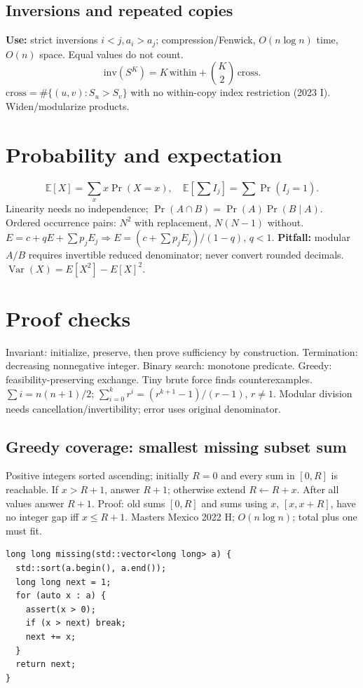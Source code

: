 \subsection{Inversions and repeated copies}
\textbf{Use:} strict inversions $i<j,a_i>a_j$; compression/Fenwick,
$O(n\log n)$ time, $O(n)$ space. Equal values do not count.
\[
\mathrm{inv}(S^K)=K\,\mathrm{within}+\binom K2\,\mathrm{cross}.
\]
$\mathrm{cross}=\#\{(u,v):S_u>S_v\}$ with no within-copy index restriction
(2023 I). Widen/modularize products.

\section{Probability and expectation}
\[
\mathbb E[X]=\sum_xx\Pr(X=x),\quad
\mathbb E[\sum I_j]=\sum\Pr(I_j=1).
\]
Linearity needs no independence; $\Pr(A\cap B)=\Pr(A)\Pr(B\mid A)$.
Ordered occurrence pairs: $N^2$ with replacement, $N(N-1)$ without.
$E=c+qE+\sum p_jE_j\Rightarrow E=(c+\sum p_jE_j)/(1-q)$, $q<1$.
\textbf{Pitfall:} modular $A/B$ requires invertible reduced denominator;
never convert rounded decimals. $\operatorname{Var}(X)=E[X^2]-E[X]^2$.

\section{Proof checks}
Invariant: initialize, preserve, then prove sufficiency by construction.
Termination: decreasing nonnegative integer. Binary search: monotone predicate.
Greedy: feasibility-preserving exchange. Tiny brute force finds counterexamples.
$\sum i=n(n+1)/2$;
$\sum_{i=0}^kr^i=(r^{k+1}-1)/(r-1)$, $r\ne1$.
Modular division needs cancellation/invertibility; error uses original denominator.

\subsection{Greedy coverage: smallest missing subset sum}
Positive integers sorted ascending; initially $R=0$ and every sum in $[0,R]$
is reachable. If $x>R+1$, answer $R+1$; otherwise extend $R\gets R+x$.
After all values answer $R+1$. Proof: old sums $[0,R]$ and sums using $x$,
$[x,x+R]$, have no integer gap iff $x\le R+1$.
Masters Mexico 2022 H; $O(n\log n)$; total plus one must fit.
\begin{lstlisting}
long long missing(std::vector<long long> a) {
  std::sort(a.begin(), a.end());
  long long next = 1;
  for (auto x : a) {
    assert(x > 0);
    if (x > next) break;
    next += x;
  }
  return next;
}
\end{lstlisting}

